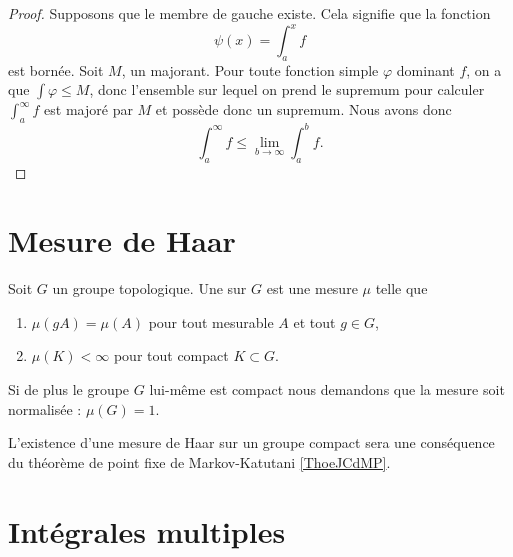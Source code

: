 \begin{proof}
    Supposons que le membre de gauche existe. Cela signifie que la fonction
    \begin{equation}
        \psi(x)=\int_a^xf
    \end{equation}
    est bornée. Soit \( M\), un majorant. Pour toute fonction simple \( \varphi\) dominant \( f\), on a que \( \int\varphi\leq M\), donc l'ensemble sur lequel on prend le supremum pour calculer \( \int_a^{\infty}f\) est majoré par \( M\) et possède donc un supremum. Nous avons donc
    \begin{equation}
        \int_a^{\infty}f\leq\lim_{b\to\infty}\int_a^bf.
    \end{equation}
\end{proof}

\section{Mesure de Haar}

\begin{definition}
    Soit \( G\) un groupe topologique. Une  sur \( G\) est une mesure \( \mu\) telle que 
    \begin{enumerate}
        \item
            \( \mu(gA)=\mu(A)\) pour tout mesurable \( A\) et tout \( g\in G\),
        \item
            \( \mu(K)<\infty\) pour tout compact \( K\subset G\).
    \end{enumerate}
    Si de plus le groupe \( G\) lui-même est compact nous demandons que la mesure soit normalisée : \( \mu(G)=1\).
\end{definition}
L'existence d'une mesure de Haar sur un groupe compact sera une conséquence du théorème de point fixe de Markov-Katutani \ref{ThoeJCdMP}.

					\section{Intégrales multiples}

